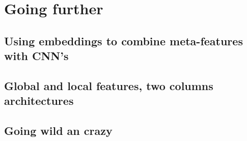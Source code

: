 \section{Going further}



\subsection{Using embeddings to combine meta-features with CNN's}


\subsection{Global and local features, two columns architectures}



\subsection{Going wild an crazy}



